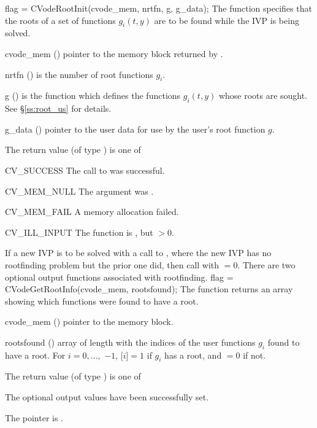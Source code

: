 {
  flag = CVodeRootInit(cvode\_mem, nrtfn, g, g\_data);
}
{
  The function  specifies that the roots of a set of
  functions $g_i(t,y)$ are to be found while the IVP is being solved.
}
{
  \begin{args}
  \item[cvode\_mem] ()
    pointer to the {\cvode} memory block returned by .
  \item[nrtfn] ()
    is the number of root functions $g_i$.
  \item[g] ()
    is the {\C} function which defines the  functions $g_i(t,y)$
    whose roots are sought. See \S\ref{ss:root_us} for details.
  \item[g\_data] ()
    pointer to the user data for use by the user's root function $g$.
 \end{args}
}
{
  The return value  (of type ) is one of
  \begin{args}
  \item[CV\_SUCCESS]
    The call to  was successful.
  \item[CV\_MEM\_NULL]
    The  argument was .
  \item[CV\_MEM\_FAIL]
    A memory allocation failed.
  \item[CV\_ILL\_INPUT]
    The function  is , but $>0$.
  \end{args}
}
{
  If a new IVP is to be solved with a call to , where the new
  IVP has no rootfinding problem but the prior one did, then call
   with $=0$.
}
There are two optional output functions associated with rootfinding.
{
  flag = CVodeGetRootInfo(cvode\_mem, rootsfound);
}
{
  The function  returns an array showing which 
  functions were found to have a root.
}
{
  \begin{args}
  \item[cvode\_mem] ()
    pointer to the {\cvode} memory block.
  \item[rootsfound] ()
    array of length  with the indices of the user functions $g_i$ found
    to have a root.  For $i = 0,\ldots, $ $-1$, [$i$]$ = 1$
    if $g_i$ has a root, and $= 0$ if not.
  \end{args}
}
{
  The return value  (of type ) is one of
  \begin{args}
  \item[\Id{CV\_SUCCESS}] 
    The optional output values have been successfully set.
  \item[\Id{CV\_MEM\_NULL}]
    The  pointer is .
  \end{args}
}

